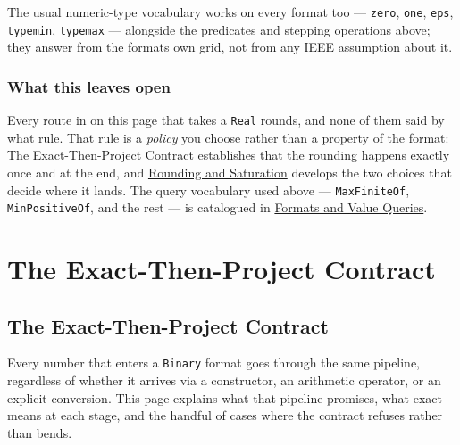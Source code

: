 \label{17547000303368754034}{}


The usual numeric-type vocabulary works on every format too — \texttt{zero}, \texttt{one}, \texttt{eps}, \texttt{typemin}, \texttt{typemax} — alongside the predicates and stepping operations above; they answer from the format{\textquotesingle}s own grid, not from any IEEE assumption about it.



\subsection{What this leaves open}



\label{15263504601444045058-dup1}{}


Every route in on this page that takes a \texttt{Real} rounds, and none of them said by what rule. That rule is a \emph{policy} you choose rather than a property of the format: \href{concept\_\allowbreak{}exact\_\allowbreak{}then\_\allowbreak{}project.md}{The Exact-Then-Project Contract} establishes that the rounding happens exactly once and at the end, and \href{concept\_\allowbreak{}rounding\_\allowbreak{}saturation.md}{Rounding and Saturation} develops the two choices that decide where it lands. The query vocabulary used above — \texttt{MaxFiniteOf}, \texttt{MinPositiveOf}, and the rest — is catalogued in \href{reference\_\allowbreak{}formats\_\allowbreak{}values.md}{Formats and Value Queries}.



\chapter{The Exact-Then-Project Contract}


\section{The Exact-Then-Project Contract}



\label{7300386083247445139}{}


Every number that enters a \texttt{Binary} format goes through the same pipeline, regardless of whether it arrives via a constructor, an arithmetic operator, or an explicit conversion. This page explains what that pipeline promises, what {\textquotedbl}exact{\textquotedbl} means at each stage, and the handful of cases where the contract refuses rather than bends.




